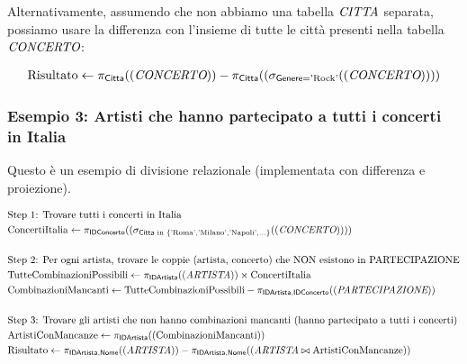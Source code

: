 	\noindent Alternativamente, assumendo che non abbiamo una tabella $\textit{CITTA}$ separata, possiamo usare la differenza con l'insieme di tutte le città presenti nella tabella $\textit{CONCERTO}$:
	
	\begin{align*}
		\text{Risultato} \leftarrow \pi_{\textsf{Citta}}((\textit{CONCERTO})) - \pi_{\textsf{Citta}}((\sigma_{\textsf{Genere} = \text{'Rock'}}((\textit{CONCERTO}))))
	\end{align*}
	
	\subsubsection{Esempio 3: Artisti che hanno partecipato a tutti i concerti in Italia}
	
	\noindent Questo è un esempio di divisione relazionale (implementata con differenza e proiezione).
	
	\begin{align*}
		& \text{Step 1: Trovare tutti i concerti in Italia} \\
		& \text{ConcertiItalia} \leftarrow \pi_{\textsf{IDConcerto}}((\sigma_{\textsf{Citta} \text{ in } \{\text{'Roma'}, \text{'Milano'}, \text{'Napoli'}, ...\}}((\textit{CONCERTO})))) \\
		& \\
		& \text{Step 2: Per ogni artista, trovare le coppie (artista, concerto) che NON esistono in PARTECIPAZIONE} \\
		& \text{TutteCombinazioniPossibili} \leftarrow \pi_{\textsf{IDArtista}}((\textit{ARTISTA})) \times \text{ConcertiItalia} \\
		& \text{CombinazioniMancanti} \leftarrow \text{TutteCombinazioniPossibili} - \pi_{\textsf{IDArtista}, \textsf{IDConcerto}}((\textit{PARTECIPAZIONE})) \\
		& \\
		& \text{Step 3: Trovare gli artisti che non hanno combinazioni mancanti (hanno partecipato a tutti i concerti)} \\
		& \text{ArtistiConMancanze} \leftarrow \pi_{\textsf{IDArtista}}((\text{CombinazioniMancanti})) \\
		& \text{Risultato} \leftarrow \pi_{\textsf{IDArtista}, \textsf{Nome}}((\textit{ARTISTA})) - \pi_{\textsf{IDArtista}, \textsf{Nome}}((\textit{ARTISTA} \bowtie \text{ArtistiConMancanze}))
	\end{align*}
	
